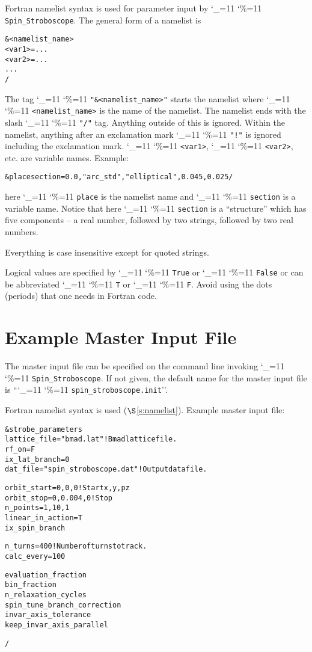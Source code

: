 \documentclass[11pt,openany]{report}
\newcommand\dottcmd[1]{\texttt{#1}\endgroup}
\newcommand{\vn}{\begingroup\catcode`\_=11 \catcode`\%=11 \dottcmd}
\newcommand{\sss}{\vn{Spin_Stroboscope}\xspace}
\newcommand{\sref}[1]{$\S$\ref{#1}}
\newlength{\ExBeg}
\newlength{\ExEnd}
\newenvironment{example}
  {\vspace{\ExBeg} \begin{alltt}}
  {\end{alltt} \vspace{\ExEnd}}
\begin{document}
Fortran namelist syntax is used for parameter input by \sss. The
general form of a namelist is
\begin{example}
  &<namelist_name>
    <var1> = ...
    <var2> = ...
    ...
  /
\end{example}
The tag \vn{"\&<namelist_name>"} starts the namelist where
\vn{<namelist_name>} is the name of the namelist. The namelist ends
with the slash \vn{"/"} tag. Anything outside of this is
ignored. Within the namelist, anything after an exclamation mark
\vn{"!"} is ignored including the exclamation mark. \vn{<var1>},
\vn{<var2>}, etc. are variable names. Example:
\begin{example}
  &place section =   0.0, "arc_std", "elliptical", 0.045, 0.025 /
\end{example}
here \vn{place} is the namelist name and \vn{section} is a
variable name.  Notice that here \vn{section} is a ``structure'' which
has five components -- a real number, followed by two strings,
followed by two real numbers.

Everything is case insensitive except for quoted strings.

Logical values are specified by \vn{True} or \vn{False} or can be
abbreviated \vn{T} or \vn{F}. Avoid using the dots (periods) that one
needs in Fortran code.

\section{Example Master Input File} 
\label{s:master.example}

The master input file can be specified on the command line invoking \sss.
If not given, the default name for the master input file is ``\vn{spin_stroboscope.init}''.

Fortran namelist syntax is used (\sref{s:namelist}). Example master input file:
\begin{example}
  &strobe_parameters
    lattice_file = "bmad.lat"                ! Bmad lattice file.
    rf_on = F
    ix_lat_branch = 0
    dat_file     = "spin_stroboscope.dat"    ! Output data file.

    orbit_start = 0, 0, 0                    ! Start x, y, pz
    orbit_stop = 0, 0.004, 0                 ! Stop
    n_points = 1, 10, 1
    linear_in_action = T
    ix_spin_branch

    n_turns = 400                            ! Number of turns to track.
    calc_every = 100

    evaluation_fraction
    bin_fraction
    n_relaxation_cycles
    spin_tune_branch_correction
    invar_axis_tolerance
    keep_invar_axis_parallel
    

  /
\end{example}
\end{document}
